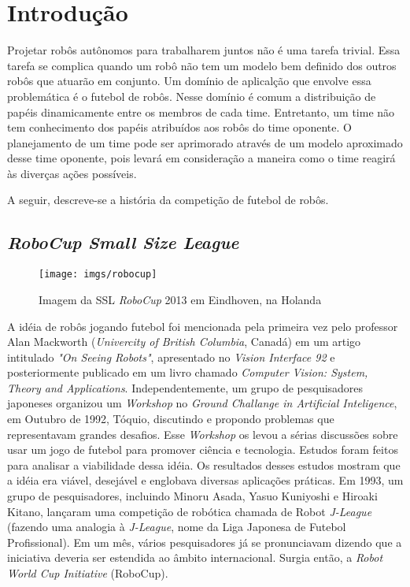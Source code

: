 \chapter{Introdução}

Projetar robôs autônomos para trabalharem juntos não é uma tarefa trivial. Essa tarefa se
complica quando um robô não tem um modelo bem definido dos outros robôs que atuarão em
conjunto. Um domínio de aplicalção que envolve essa problemática é o futebol de robôs.
Nesse domínio é comum a distribuição de papéis dinamicamente entre os membros de cada
time. Entretanto, um time não tem conhecimento dos papéis atribuídos aos robôs
do time oponente. O planejamento de um time pode ser aprimorado através de um modelo
aproximado desse time oponente, pois levará em consideração a maneira como o
time reagirá às diverças ações possíveis.

A seguir, descreve-se a história da competição de futebol de robôs.

\section{\textit{RoboCup Small Size League}}

\begin{figure}
  \texttt{[image: imgs/robocup]}\label{robocup2013}
  \caption{Imagem da SSL \textit{RoboCup} 2013 em Eindhoven, na Holanda}
\end{figure}

A idéia de robôs jogando futebol foi mencionada pela primeira vez pelo professor
Alan Mackworth (\textit{Univercity of British Columbia}, Canadá) em um artigo intitulado
\textit{"On Seeing Robots"}, apresentado no \textit{Vision Interface 92} e posteriormente publicado em
um livro chamado \textit{Computer Vision: System, Theory and Applications}. Independentemente,
um grupo de pesquisadores japoneses organizou um \textit{Workshop} no \textit{Ground Challange
in Artificial Inteligence}, em Outubro de 1992, Tóquio, discutindo e propondo problemas que
representavam grandes desafios. Esse \textit{Workshop} os levou a sérias discussões sobre
usar um jogo de futebol para promover ciência e tecnologia. Estudos foram feitos para
analisar a viabilidade dessa idéia. Os resultados desses estudos mostram que
a idéia era viável, desejável e englobava diversas aplicações práticas. Em 1993, um
grupo de pesquisadores, incluindo Minoru Asada, Yasuo Kuniyoshi e Hiroaki Kitano,
lançaram uma competição de robótica chamada de Robot \textit{J-League} (fazendo uma analogia à
\textit{J-League}, nome da Liga Japonesa de Futebol Profissional). Em um mês, vários
pesquisadores já se pronunciavam dizendo que a iniciativa deveria ser estendida ao
âmbito internacional. Surgia então, a \textit{Robot World Cup Initiative} (RoboCup).


